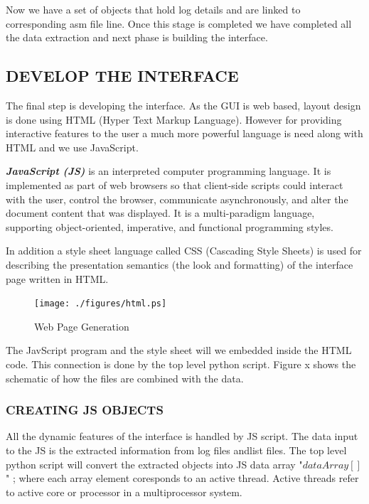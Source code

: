 \vspace{1.5cm}
Now we have a set of objects that hold log details and are linked to corresponding asm file line. Once this stage is completed we have completed all the data extraction and next phase is building the interface.

\subsection {DEVELOP THE INTERFACE}

The final step is developing the interface. As the GUI is web based, layout design is done using HTML (Hyper Text Markup Language). However for providing interactive features to the user a much more powerful language is need along with HTML and we use JavaScript.

\emph {\bf JavaScript (JS)} is an interpreted computer programming language. It is  implemented as part of web browsers so that client-side scripts could interact with the user, control the browser, communicate asynchronously, and alter the document content that was displayed. It is a multi-paradigm language, supporting object-oriented, imperative, and functional programming styles.

In addition a style sheet language called CSS (Cascading Style Sheets) is used for describing the presentation semantics (the look and formatting) of the interface page written in HTML.
\begin{figure}[H]
\centering
\texttt{[image: ./figures/html.ps]}
\caption{Web Page Generation}
\end{figure}


The JavScript program and the style sheet will we embedded inside the HTML code. This connection is done by the top level python script. Figure x shows the schematic of how the files are combined with the data.



\subsubsection{CREATING JS OBJECTS}
All the dynamic features of the interface is handled by JS script. The data input to the JS is the extracted information from log files andlist files. The top level python script will convert the extracted objects into JS data array "$dataArray[]$" ; where each array element coresponds to an active thread. Active threads refer to active core or processor in a multiprocessor system.  

